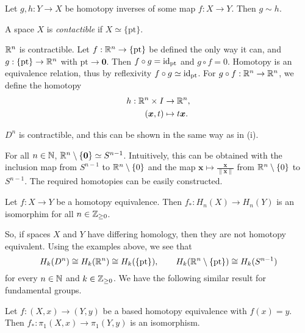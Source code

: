 \begin{lemma}
	Let $g, h: Y \to X$ be homotopy inverses of some map $f: X \to Y$. Then $g \sim h$.
\end{lemma}

\begin{definition}[Contractible]
	A space $X$ is \emph{contactible} if $X \simeq \{\text{pt}\}$.
\end{definition}

\begin{example}
	$\mathbb{R}^n$ is contractible. Let $f: \mathbb{R}^n \to \{\text{pt}\}$ be defined the only way it can, and $g: \{\text{pt}\} \to \mathbb{R}^n$ with $\text{pt} \to \bm 0$. Then $f \circ g = \operatorname{id}_\text{pt}$ and $g \circ f = 0$. Homotopy is an equivalence relation, thus by reflexivity $f \circ g \simeq \operatorname{id}_{\text{pt}}$. For $g \circ f: \mathbb{R}^n \to \mathbb{R}^n$, we define the homotopy
	\begin{align*}
		h: \mathbb{R}^n \times I & \to \mathbb{R}^n,       \\
		(\bm x, t)       & \mapsto t\bm x.
	\end{align*}
\end{example}

\begin{example}
	$D^n$ is contractible, and this can be shown in the same way as in (i).
\end{example}

\begin{example}
	For all $n \in \mathbb{N}$, $\mathbb{R}^n \setminus \{\bm 0\} \simeq S^{n-1}$. Intuitively, this can be obtained with the inclusion map from $S^{n-1}$ to $\mathbb{R}^n\setminus\{0\}$ and the map $\bm x \mapsto \frac{\bm x}{\lVert \bm x \rVert}$ from $\mathbb{R}^n \setminus\{0\}$ to $S^{n-1}$. The required homotopies can be easily constructed.
\end{example}

\begin{theorem}
	Let $f: X \to Y$ be a homotopy equivalence. Then $f_*: H_n(X) \to H_n(Y)$ is an isomorphim for all $n \in \mathbb{Z}_{\geq 0}$.
\end{theorem}

So, if spaces $X$ and $Y$ have differing homology, then they are not homotopy equivalent. Using the examples above, we see that
\[ H_k(D^n) \cong H_k(\mathbb{R}^n) \cong H_k(\{\text{pt}\}), \qquad H_k(\mathbb{R}^n \setminus\{\text{pt}\}) \cong H_k(S^{n-1}) \]
for every $n \in \mathbb{N}$ and $k \in \mathbb{Z}_{\geq 0}$. We have the following similar result for fundamental groups.

\begin{theorem}
	Let $f: (X,x) \to (Y, y)$ be a based homotopy equivalence with $f(x) = y$. Then $f_*: \pi_1(X,x) \to \pi_1(Y, y)$ is an isomorphism.
\end{theorem}

